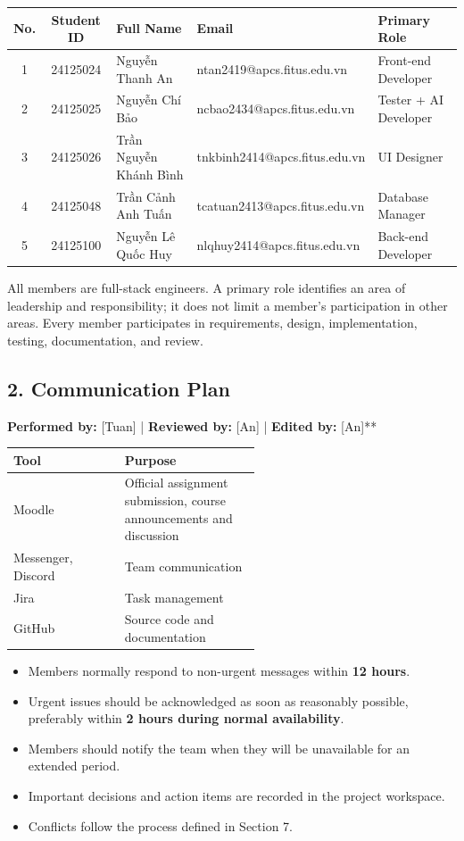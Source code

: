 \documentclass[12pt]{article}
\begin{document}
\begin{table}[H]
\centering\footnotesize
\setlength{\tabcolsep}{3pt}
\begin{tabular}{|c|c|l|l|l|}
\hline
No. & Student ID & Full Name & Email & Primary Role \\
\hline
1 & 24125024 & Nguyễn Thanh An & ntan2419@apcs.fitus.edu.vn & Front-end Developer \\
\hline
2 & 24125025 & Nguyễn Chí Bảo & ncbao2434@apcs.fitus.edu.vn & Tester + AI Developer \\
\hline
3 & 24125026 & Trần Nguyễn Khánh Bình & tnkbinh2414@apcs.fitus.edu.vn & UI Designer \\
\hline
4 & 24125048 & Trần Cảnh Anh Tuấn & tcatuan2413@apcs.fitus.edu.vn & Database Manager \\
\hline
5 & 24125100 & Nguyễn Lê Quốc Huy & nlqhuy2414@apcs.fitus.edu.vn & Back-end Developer \\
\hline
\end{tabular}
\end{table}

All members are full-stack engineers. A primary role identifies an area of leadership and responsibility; it does not limit a member's participation in other areas. Every member participates in requirements, design, implementation, testing, documentation, and review.

\subsection{2. Communication Plan}

\textbf{Performed by:} [Tuan] | \textbf{Reviewed by:} [An] | \textbf{Edited by:} [An]**

\begin{table}[H]
\centering
\begin{tabular}{|l|p{0.55\linewidth}|}
\hline
Tool & Purpose \\
\hline
Moodle & Official assignment submission, course announcements and discussion \\
\hline
Messenger, Discord & Team communication \\
\hline
Jira & Task management \\
\hline
GitHub & Source code and documentation \\
\hline
\end{tabular}
\end{table}

\begin{itemize}
    \item Members normally respond to non-urgent messages within \textbf{12 hours}.
    \item Urgent issues should be acknowledged as soon as reasonably possible, preferably within \textbf{2 hours during normal availability}.
    \item Members should notify the team when they will be unavailable for an extended period.
    \item Important decisions and action items are recorded in the project workspace.
    \item Conflicts follow the process defined in Section 7.
\end{itemize}
\end{document}
